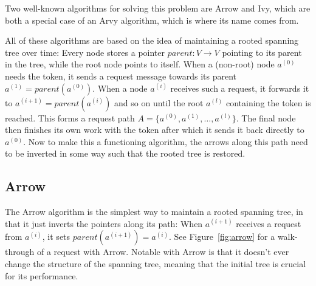 \documentclass[a4paper, oneside]{discothesis}
\begin{document}
Two well-known algorithms for solving this problem are Arrow and Ivy, which are both a special case of an Arvy algorithm, which is where its name comes from.

All of these algorithms are based on the idea of maintaining a rooted spanning tree over time: Every node stores a pointer $parent : V \rightarrow V$ pointing to its parent in the tree, while the root node points to itself. When a (non-root) node $a^{(0)}$ needs the token, it sends a request message towards its parent $a^{(1)}=parent(a^{(0)})$. When a node $a^{(i)}$ receives such a request, it forwards it to $a^{(i+1)}=parent(a^{(i)})$ and so on until the root $a^{(l)}$ containing the token is reached. This forms a request path $A=\{a^{(0)},a^{(1)},\dots,a^{(l)}\}$. The final node then finishes its own work with the token after which it sends it back directly to $a^{(0)}$. Now to make this a functioning algorithm, the arrows along this path need to be inverted in some way such that the rooted tree is restored.


\newpage
\subsection{Arrow}
\label{intro:arrow}

The Arrow algorithm is the simplest way to maintain a rooted spanning tree, in that it just inverts the pointers along its path: When $a^{(i+1)}$ receives a request from $a^{(i)}$, it sets $parent(a^{(i+1)})=a^{(i)}$. See Figure~\ref{fig:arrow} for a walk-through of a request with Arrow. Notable with Arrow is that it doesn't ever change the structure of the spanning tree, meaning that the initial tree is crucial for its performance.
\end{document}
